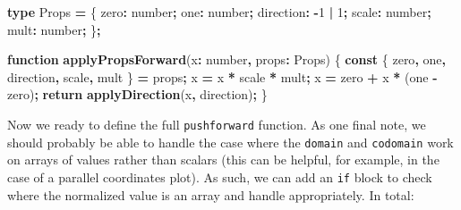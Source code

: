\documentclass[
]{book}
\newenvironment{Shaded}{\begin{snugshade}}{\end{snugshade}}
\newcommand{\ControlFlowTok}[1]{\textcolor[rgb]{0.13,0.29,0.53}{\textbf{#1}}}
\newcommand{\DataTypeTok}[1]{\textcolor[rgb]{0.13,0.29,0.53}{#1}}
\newcommand{\DecValTok}[1]{\textcolor[rgb]{0.00,0.00,0.81}{#1}}
\newcommand{\FunctionTok}[1]{\textcolor[rgb]{0.13,0.29,0.53}{\textbf{#1}}}
\newcommand{\KeywordTok}[1]{\textcolor[rgb]{0.13,0.29,0.53}{\textbf{#1}}}
\newcommand{\NormalTok}[1]{#1}
\newcommand{\OperatorTok}[1]{\textcolor[rgb]{0.81,0.36,0.00}{\textbf{#1}}}
\theoremstyle{definition}
\theoremstyle{definition}
\theoremstyle{definition}
\theoremstyle{definition}
\theoremstyle{remark}
\begin{document}
\begin{Shaded}
\begin{Highlighting}[]
\KeywordTok{type}\NormalTok{ Props }\OperatorTok{=}\NormalTok{ \{}
\NormalTok{  zero}\OperatorTok{:} \DataTypeTok{number}\OperatorTok{;}
\NormalTok{  one}\OperatorTok{:} \DataTypeTok{number}\OperatorTok{;}
\NormalTok{  direction}\OperatorTok{:} \OperatorTok{{-}}\DecValTok{1} \OperatorTok{|} \DecValTok{1}\OperatorTok{;}
\NormalTok{  scale}\OperatorTok{:} \DataTypeTok{number}\OperatorTok{;}
\NormalTok{  mult}\OperatorTok{:} \DataTypeTok{number}\OperatorTok{;}
\NormalTok{\}}\OperatorTok{;}

\KeywordTok{function} \FunctionTok{applyPropsForward}\NormalTok{(x}\OperatorTok{:} \DataTypeTok{number}\OperatorTok{,}\NormalTok{ props}\OperatorTok{:}\NormalTok{ Props) \{}
  \KeywordTok{const}\NormalTok{ \{ zero}\OperatorTok{,}\NormalTok{ one}\OperatorTok{,}\NormalTok{ direction}\OperatorTok{,}\NormalTok{ scale}\OperatorTok{,}\NormalTok{ mult \} }\OperatorTok{=}\NormalTok{ props}\OperatorTok{;}
\NormalTok{  x }\OperatorTok{=}\NormalTok{ x }\OperatorTok{*}\NormalTok{ scale }\OperatorTok{*}\NormalTok{ mult}\OperatorTok{;}
\NormalTok{  x }\OperatorTok{=}\NormalTok{ zero }\OperatorTok{+}\NormalTok{ x }\OperatorTok{*}\NormalTok{ (one }\OperatorTok{{-}}\NormalTok{ zero)}\OperatorTok{;}
  \ControlFlowTok{return} \FunctionTok{applyDirection}\NormalTok{(x}\OperatorTok{,}\NormalTok{ direction)}\OperatorTok{;}
\NormalTok{\}}
\end{Highlighting}
\end{Shaded}

Now we ready to define the full \texttt{pushforward} function. As one final note, we should probably be able to handle the case where the \texttt{domain} and \texttt{codomain} work on arrays of values rather than scalars (this can be helpful, for example, in the case of a parallel coordinates plot). As such, we can add an \texttt{if} block to check where the normalized value is an array and handle appropriately. In total:
\end{document}
